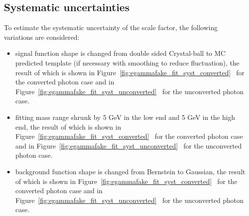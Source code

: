 \subsection{Systematic uncertainties}
\label{sec:efake_systematics}
To estimate the systematic uncertainty of the scale factor, the following variations are considered: 
\begin{itemize}
\item signal function shape is changed from double sided Crystal-ball to MC predicted template (if necessary with smoothing to reduce fluctuation), the result of which is shown in Figure~\ref{fig:egammafake_fit_syst_converted}~ for the converted photon case and in Figure~\ref{fig:egammafake_fit_syst_unconverted}~ for the unconverted photon case. %
\item fitting mass range shrunk by 5 GeV in the low end and 5 GeV in the high end, the result of which is shown in Figure~\ref{fig:egammafake_fit_syst_converted}~ for the converted photon case and in Figure~\ref{fig:egammafake_fit_syst_unconverted}~ for the unconverted photon case. %
\item background function shape is changed from Bernstein to Gaussian, the result of which is shown in Figure~\ref{fig:egammafake_fit_syst_converted}~ for the converted photon case and in Figure~\ref{fig:egammafake_fit_syst_unconverted}~ for the unconverted photon case. %
\end{itemize}

